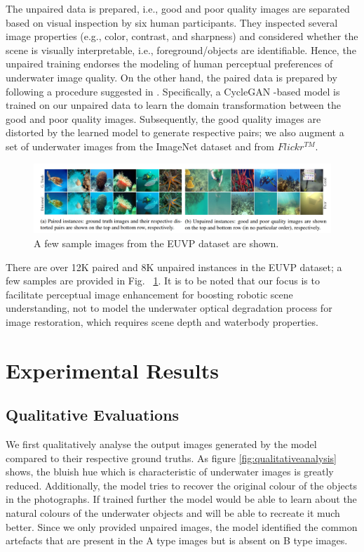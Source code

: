\documentclass[a4paper]{article}
\begin{document}
The unpaired data is prepared, i.e., good and poor quality images are separated based on visual inspection by six human participants. They inspected several image properties (e.g., color, contrast, and sharpness) and considered whether the scene is visually interpretable, i.e., foreground/objects are identifiable. Hence, the unpaired training endorses the modeling of human perceptual preferences of underwater image quality. On the other hand, the paired data is prepared by following a procedure suggested in \cite{fabbri2018enhancing}. Specifically, a CycleGAN \cite{zhu2020unpaired}-based model is trained on our unpaired data to learn the domain transformation between the good and poor quality images. Subsequently, the good quality images are distorted by the learned model to generate respective pairs; we also augment a set of underwater images from the ImageNet dataset \cite{5206848} and from $Flickr^{TM}$.

\begin{figure}[H]
  \centering
  \includegraphics[width=1\textwidth]{euvp_some_example.png}
  \caption{A few sample images from the EUVP dataset are shown.}
  \label{fig:euvpdatasetexample}
\end{figure}

There are over 12K paired and 8K unpaired instances in the EUVP dataset; a few samples are provided in Fig. ~\ref{fig:euvpdatasetexample}. It is to be noted that our focus is to facilitate perceptual image enhancement for boosting robotic scene understanding, not to model the underwater optical degradation process for image restoration, which requires scene depth and waterbody properties.


\section{Experimental Results}
\subsection{Qualitative Evaluations}
We first qualitatively analyse the output images generated by the model compared to their respective ground truths. As figure \ref{fig:qualitativeanalysis} shows, the bluish hue which is characteristic of underwater images is greatly reduced. Additionally, the model tries to recover the original colour of the objects in the photographs. If trained further the model would be able to learn about the natural colours of the underwater objects and will be able to recreate it much better. Since we only provided unpaired images, the model identified the common artefacts that are present in the A type images but is absent on B type images.
\end{document}
